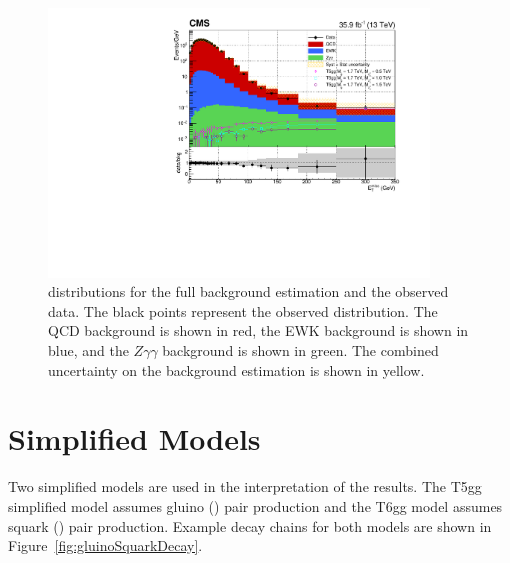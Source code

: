 \begin{figure}[h]
\begin{center}
\includegraphics[width=0.9\textwidth]{Figures/Results/finalPlot.pdf}
\end{center}
\caption{\ETmiss distributions for the full background estimation and the observed data. The black points represent the observed \ETmiss distribution. 
The QCD background is shown in red, the EWK background
is shown in blue, and the $Z\gamma\gamma$ background is shown in green. 
The combined uncertainty on the background estimation is shown in yellow.}
\label{fig:FinalPlot}
\end{figure}


\section{Simplified Models}
\label{sec:SimplifiedModels}

Two simplified models are used in the interpretation of the results. The T5gg simplified model assumes gluino (\gluino) pair production and the T6gg model assumes squark (\squark) pair production. Example decay chains for both models are shown in Figure~\ref{fig:gluinoSquarkDecay}.

